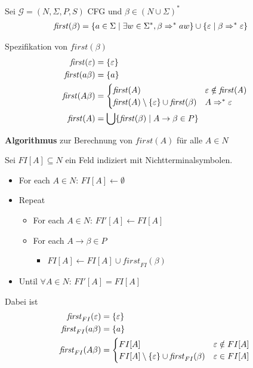 {\begin{Def}
  Sei $\mathcal{G} = (N, \Sigma, P, S)$ CFG und $\beta \in
  (N\cup\Sigma)^*$
  \begin{align*}
    \mathit{first} (\beta) &= \{ a \in \Sigma \mid \exists w\in
    \Sigma^* , \beta \=>^* aw \} \cup \{\Eps \mid \beta \=>^* \Eps \}
  \end{align*}
\end{Def}

Spezifikation von $\mathit{first}(\beta)$
\begin{align*}
  \mathit{first} (\Eps) & = \{ \Eps \} \\
  \mathit{first} (a\beta) & = \{ a \} \\
  \mathit{first} (A\beta) & =
  \begin{cases}
    \mathit{first} (A) & \Eps \notin \mathit{first (A)} \\
    \mathit{first} (A) \setminus \{\Eps\} \cup \mathit{first} (\beta)
    & A\=>^* \Eps
  \end{cases} \\
  \mathit{first} (A) &= \bigcup  \{ \mathit{first} (\beta) \mid A \to
  \beta \in P \}
\end{align*}

\textbf{Algorithmus} zur Berechnung von $\mathit{first} (A)$ für alle $A\in N$

Sei $FI[A] \subseteq N$ ein Feld indiziert mit Nichtterminalsymbolen.

\begin{itemize}
\item[] For each $A \in N$: $FI[A] \gets \emptyset$
\item[] Repeat
  \begin{itemize}
  \item[] For each $A\in N$: $FI'[A] \gets FI[A]$
  \item[] For each $A \to \beta \in P$
    \begin{itemize}
    \item[] $FI[A] \gets FI[A] \cup \mathit{first}_{FI} (\beta)$
    \end{itemize}
  \end{itemize}
\item[] Until $\forall A\in N$: $FI'[A] = FI[A]$
\end{itemize}

Dabei ist
\begin{align*}
  \mathit{first}_{FI} (\varepsilon) & = \{ \varepsilon \} \\
  \mathit{first}_{FI} (a\beta) & = \{ a \} \\
  \mathit{first}_{FI} (A\beta) & =
  \begin{cases}
    FI[A] & \varepsilon \notin FI[A] \\
    FI[A] \setminus \{\varepsilon\} \cup \mathit{first}_{FI} (\beta)
    & \varepsilon\in FI[A]
  \end{cases} 
\end{align*}

}
